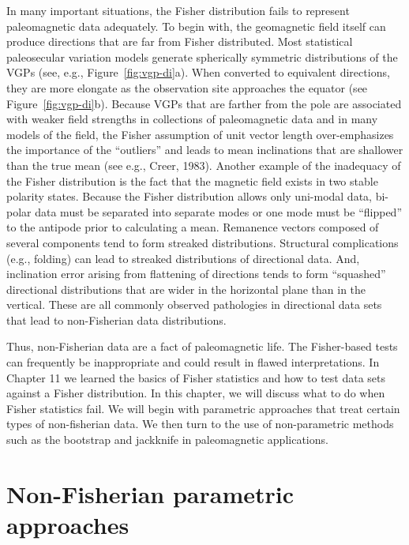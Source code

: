 In many important
situations, the 
Fisher distribution fails to represent paleomagnetic data adequately.
To begin with, the geomagnetic field itself can produce directions that are far from Fisher distributed.    Most statistical paleosecular variation models generate spherically symmetric distributions of the VGPs (see, e.g., Figure~\ref{fig:vgp-di}a).   When converted to equivalent directions, they are more elongate as the observation site approaches the equator (see Figure~\ref{fig:vgp-di}b).      Because VGPs that are farther from the pole are associated with weaker field strengths in collections of paleomagnetic data and in many models of the field,  the Fisher assumption of unit vector length over-emphasizes the importance of the ``outliers'' and leads to mean inclinations that are shallower than the true mean (see e.g., 
Creer, 1983).  \nocite{creer83} 
Another example of the inadequacy of the 
Fisher distribution is the fact that the magnetic field exists in two stable 
polarity states.  Because the
 Fisher
distribution allows only uni-modal data, bi-polar data must be separated into separate modes  or one mode must be ``flipped'' to the antipode prior to calculating a mean.  
Remanence vectors composed of
several components tend to form streaked distributions. Structural complications (e.g., folding) can lead to streaked
distributions of directional data.  And, inclination error arising from flattening of directions tends to form ``squashed'' directional distributions that are wider in the horizontal plane than in the vertical.   These are all commonly observed pathologies in directional data sets that lead to non-Fisherian data distributions.   
 
  Thus,
 non-Fisherian data are a fact of paleomagnetic life.  
 The Fisher-based tests can frequently be inappropriate and could 
result in  flawed interpretations.
In Chapter 11 we learned the basics of Fisher statistics and
how to test data sets against a Fisher distribution.  In this chapter,
we will discuss what to do when Fisher statistics fail.  We will begin with  parametric approaches that treat certain types of non-fisherian data.  We then turn to the use of  non-parametric methods such as the   bootstrap and jackknife in paleomagnetic applications.   

\section {Non-Fisherian parametric approaches}
    
